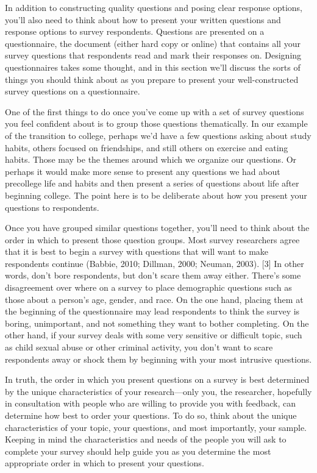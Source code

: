 In addition to constructing quality questions and posing clear response options, you’ll also need to think about how to present your written questions and response options to survey respondents. Questions are presented on a questionnaire, the document (either hard copy or online) that contains all your survey questions that respondents read and mark their responses on. Designing questionnaires takes some thought, and in this section we’ll discuss the sorts of things you should think about as you prepare to present your well-constructed survey questions on a questionnaire.

One of the first things to do once you’ve come up with a set of survey questions you feel confident about is to group those questions thematically. In our example of the transition to college, perhaps we’d have a few questions asking about study habits, others focused on friendships, and still others on exercise and eating habits. Those may be the themes around which we organize our questions. Or perhaps it would make more sense to present any questions we had about precollege life and habits and then present a series of questions about life after beginning college. The point here is to be deliberate about how you present your questions to respondents.

Once you have grouped similar questions together, you’ll need to think about the order in which to present those question groups. Most survey researchers agree that it is best to begin a survey with questions that will want to make respondents continue (Babbie, 2010; Dillman, 2000; Neuman, 2003). [3] In other words, don’t bore respondents, but don’t scare them away either. There’s some disagreement over where on a survey to place demographic questions such as those about a person’s age, gender, and race. On the one hand, placing them at the beginning of the questionnaire may lead respondents to think the survey is boring, unimportant, and not something they want to bother completing. On the other hand, if your survey deals with some very sensitive or difficult topic, such as child sexual abuse or other criminal activity, you don’t want to scare respondents away or shock them by beginning with your most intrusive questions.

In truth, the order in which you present questions on a survey is best determined by the unique characteristics of your research—only you, the researcher, hopefully in consultation with people who are willing to provide you with feedback, can determine how best to order your questions. To do so, think about the unique characteristics of your topic, your questions, and most importantly, your sample. Keeping in mind the characteristics and needs of the people you will ask to complete your survey should help guide you as you determine the most appropriate order in which to present your questions.

